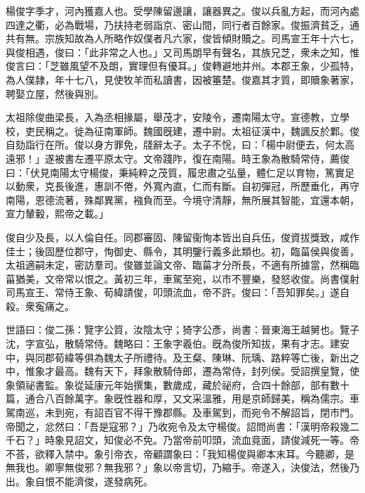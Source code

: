 
\begin{pinyinscope}
楊俊字季才，河內獲嘉人也。受學陳留邊讓，讓器異之。俊以兵亂方起，而河內處四達之衢，必為戰場，乃扶持老弱詣京、密山間，同行者百餘家。俊振濟貧乏，通共有無。宗族知故為人所略作奴僕者凡六家，俊皆傾財贖之。司馬宣王年十六七，與俊相遇，俊曰：「此非常之人也。」又司馬朗早有聲名，其族兄芝，衆未之知，惟俊言曰：「芝雖風望不及朗，實理但有優耳。」俊轉避地并州。本郡王象，少孤特，為人僕隷，年十七八，見使牧羊而私讀書，因被箠楚。俊嘉其才質，即贖象著家，聘娶立屋，然後與別。

太祖除俊曲梁長，入為丞相掾屬，舉茂才，安陵令，遷南陽太守。宣德教，立學校，吏民稱之。徙為征南軍師。魏國旣建，遷中尉。太祖征漢中，魏諷反於鄴。俊自劾詣行在所。俊以身方罪免，牋辭太子。太子不恱，曰：「楊中尉便去，何太高遠邪！」遂被書左遷平原太守。文帝踐阼，復在南陽。時王象為散騎常侍，薦俊曰：「伏見南陽太守楊俊，秉純粹之茂質，履忠肅之弘量，體仁足以育物，篤實足以動衆，克長後進，惠訓不倦，外寬內直，仁而有斷。自初彈冠，所歷垂化，再守南陽，恩德流著，殊鄰異黨，襁負而至。今境守清靜，無所展其智能，宜還本朝，宣力輦轂，熙帝之載。」

俊自少及長，以人倫自任。同郡審固、陳留衞恂本皆出自兵伍，俊資拔獎致，咸作佳士；後固歷位郡守，恂御史、縣令，其明鑒行義多此類也。初，臨菑侯與俊善，太祖適嗣未定，密訪羣司。俊雖並論文帝、臨菑才分所長，不適有所據當，然稱臨菑猶美，文帝常以恨之。黃初三年，車駕至宛，以巿不豐樂，發怒收俊。尚書僕射司馬宣王、常侍王象、荀緯請俊，叩頭流血，帝不許。俊曰：「吾知罪矣。」遂自殺。衆寃痛之。

世語曰：俊二孫：覽字公質，汝陰太守；猗字公彥，尚書：晉東海王越舅也。覽子沈，字宣弘，散騎常侍。魏略曰：王象字羲伯。旣為俊所知拔，果有才志。建安中，與同郡荀緯等俱為魏太子所禮待。及王粲、陳琳、阮瑀、路粹等亡後，新出之中，惟象才最高。魏有天下，拜象散騎侍郎，遷為常侍，封列侯。受詔撰皇覽，使象領祕書監。象從延康元年始撰集，數歲成，藏於祕府，合四十餘部，部有數十篇，通合八百餘萬字。象旣性器和厚，又文采溫雅，用是京師歸美，稱為儒宗。車駕南巡，未到宛，有詔百官不得干豫郡縣。及車駕到，而宛令不解詔旨，閉巿門。帝聞之，忿然曰：「吾是寇邪？」乃收宛令及太守楊俊。詔問尚書：「漢明帝殺幾二千石？」時象見詔文，知俊必不免。乃當帝前叩頭，流血竟面，請俊減死一等。帝不荅，欲釋入禁中。象引帝衣，帝顧謂象曰：「我知楊俊與卿本末耳。今聽卿，是無我也。卿寧無俊邪？無我邪？」象以帝言切，乃縮手。帝遂入，決俊法，然後乃出。象自恨不能濟俊，遂發病死。


\end{pinyinscope}